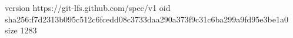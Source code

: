 version https://git-lfs.github.com/spec/v1
oid sha256:f7d2313b095c512c6fcedd08c3733daa290a373f9c31c6ba299a9fd95e3be1a0
size 1283
